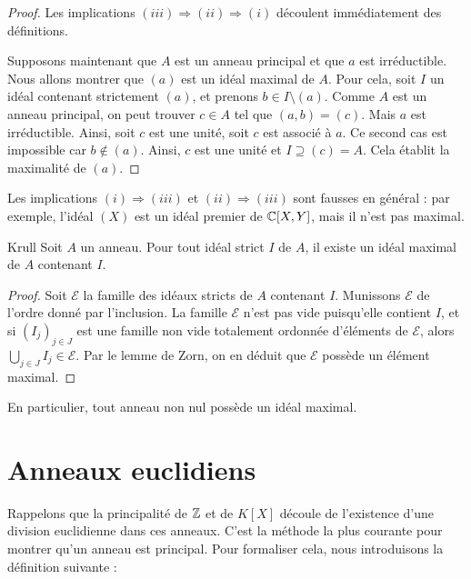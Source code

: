 \documentclass[]{report}
\begin{document}
\begin{proof}
    Les implications $(iii) \Rightarrow (ii) \Rightarrow (i)$ découlent immédiatement des définitions.

    Supposons maintenant que $A$ est un anneau principal et que $a$ est irréductible. Nous allons montrer que $(a)$ est un idéal maximal de $A$. Pour cela, soit $I$ un idéal contenant strictement $(a)$, et prenons $b \in I \setminus (a)$. Comme $A$ est un anneau principal, on peut trouver $c \in A$ tel que $(a, b) = (c)$. Mais $a$ est irréductible. Ainsi, soit $c$ est une unité, soit $c$ est associé à $a$. Ce second cas est impossible car $b \notin (a)$. Ainsi, $c$ est une unité et $I \supseteq (c) = A$. Cela établit la maximalité de $(a)$.
\end{proof}

\begin{re}{}{}
    Les implications $(i) \Rightarrow (iii)$ et $(ii) \Rightarrow (iii)$ sont fausses en général : par exemple, l'idéal $(X)$ est un idéal premier de $\mathbb{C}[X, Y]$, mais il n'est pas maximal.
\end{re}

\begin{tm}{Krull}{}
    Soit $A$ un anneau. Pour tout idéal strict $I$ de $A$, il existe un idéal maximal de $A$ contenant $I$.
\end{tm}

\begin{proof}
    Soit $\mathscr{E}$ la famille des idéaux stricts de $A$ contenant $I$. Munissons $\mathscr{E}$ de l'ordre donné par l'inclusion. La famille $\mathscr{E}$ n'est pas vide puisqu'elle contient $I$, et si $(I_j)_{j \in J}$ est une famille non vide totalement ordonnée d'éléments de $\mathscr{E}$, alors $\bigcup_{j \in J} I_j \in \mathscr{E}$. Par le lemme de Zorn, on en déduit que $\mathscr{E}$ possède un élément maximal.
\end{proof}

En particulier, tout anneau non nul possède un idéal maximal.

\section{Anneaux euclidiens}

Rappelons que la principalité de $\mathbb{Z}$ et de $K[X]$ découle de l'existence d'une division euclidienne dans ces anneaux. C'est la méthode la plus courante pour montrer qu'un anneau est principal. Pour formaliser cela, nous introduisons la définition suivante :
\end{document}
